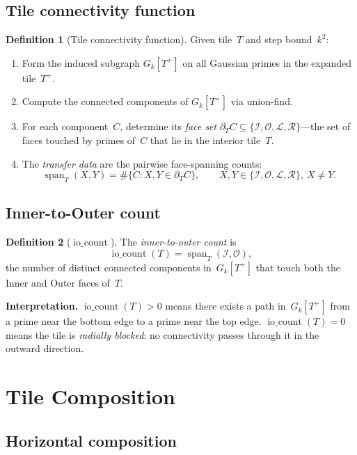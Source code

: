 \documentclass[11pt,a4paper]{article}
\newcommand{\Gk}{G_k}
\newcommand{\iocount}{\operatorname{io\_count}}
\newcommand{\spant}{\operatorname{span}_T}
\newcommand{\fI}{\mathcal{I}}
\newcommand{\fO}{\mathcal{O}}
\newcommand{\fL}{\mathcal{L}}
\newcommand{\fR}{\mathcal{R}}
\newcommand{\Tplus}{T^+}
\theoremstyle{definition}
\newtheorem{definition}{Definition}[section]
\theoremstyle{plain}
\theoremstyle{remark}
\begin{document}
\subsection{Tile connectivity function}

\begin{definition}[Tile connectivity function]\label{def:tile-connectivity}
Given tile~$T$ and step bound~$k^2$:
\begin{enumerate}
  \item Form the induced subgraph $\Gk[\Tplus]$ on all Gaussian primes in the expanded tile~$\Tplus$.
  \item Compute the connected components of $\Gk[\Tplus]$ via union-find.
  \item For each component~$C$, determine its \emph{face set} $\partial_T C \subseteq \{\fI, \fO, \fL, \fR\}$---the set of faces touched by primes of~$C$ that lie in the interior tile~$T$.
  \item The \emph{transfer data} are the pairwise face-spanning counts:
  \[
    \spant(X, Y) = \#\{C : X, Y \in \partial_T C\}, \qquad X, Y \in \{\fI, \fO, \fL, \fR\},\ X \ne Y.
  \]
\end{enumerate}
\end{definition}

\subsection{Inner-to-Outer count}

\begin{definition}[\texorpdfstring{$\iocount$}{io\_count}]\label{def:io-count}
The \emph{inner-to-outer count} is
\[
  \iocount(T) = \spant(\fI, \fO),
\]
the number of distinct connected components in~$\Gk[\Tplus]$ that touch both the Inner and Outer faces of~$T$.
\end{definition}

\noindent\textbf{Interpretation.}  $\iocount(T) > 0$ means there exists a path in~$\Gk[\Tplus]$ from a prime near the bottom edge to a prime near the top edge.  $\iocount(T) = 0$ means the tile is \emph{radially blocked}: no connectivity passes through it in the outward direction.


\section{Tile Composition}\label{sec:composition}

\subsection{Horizontal composition}
\end{document}
